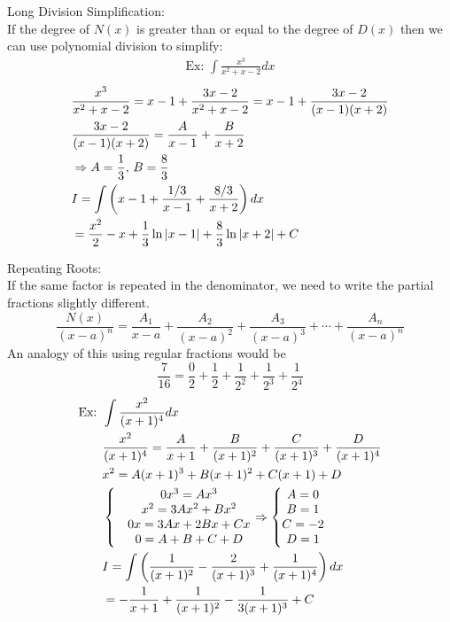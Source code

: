 \documentclass[11pt, fleqn]{article}
\begin{document}
Long Division Simplification:\\
If the degree of $N(x)$ is greater than or equal to the degree of $D(x)$ then we can use polynomial division to simplify:\\
\begin{align*}
    \text{Ex: }\int\frac{x^3}{x^2+x-2}dx
\end{align*}
\begin{align*}
    &\frac{x^3}{x^2+x-2}=x-1+\frac{3x-2}{x^2+x-2}=x-1+\frac{3x-2}{(x-1)(x+2)}\\
    &\frac{3x-2}{(x-1)(x+2)}=\frac{A}{x-1}+\frac{B}{x+2}\\
    &\Rightarrow A=\frac{1}{3},\,B=\frac{8}{3}\\
    &I=\int\left( x-1+\frac{1/3}{x-1}+\frac{8/3}{x+2} \right)dx\\
    &=\frac{x^2}{2}-x+\frac{1}{3}\ln|x-1|+\frac{8}{3}\ln|x+2|+C
\end{align*}

Repeating Roots:\\
If the same factor is repeated in the denominator, we need to write the partial fractions slightly different.
$$\frac{N(x)}{(x-a)^n}=\frac{A_1}{x-a}+\frac{A_2}{(x-a)^2}+\frac{A_3}{(x-a)^3}+\cdots+\frac{A_n}{(x-a)^n}$$
An analogy of this using regular fractions would be
$$\frac{7}{16}=\frac{0}{2}+\frac{1}{2}+\frac{1}{2^2}+\frac{1}{2^3}+\frac{1}{2^4}$$
\begin{align*}
    \text{Ex: }&\int\frac{x^2}{(x+1)^4}dx\\
    &\frac{x^2}{(x+1)^4}=\frac{A}{x+1}+\frac{B}{(x+1)^2}+\frac{C}{(x+1)^3}+\frac{D}{(x+1)^4}\\
    &x^2=A(x+1)^3+B(x+1)^2+C(x+1)+D\\
    &\left\{\begin{matrix} &0x^3=Ax^3\\&x^2=3Ax^2+Bx^2\\&0x=3Ax+2Bx+Cx\\&0=A+B+C+D \end{matrix}\right.\Rightarrow\left\{\begin{matrix} A=0\\B=1\\C=-2\\D=1 \end{matrix}\right.\\
    &I=\int\left( \frac{1}{(x+1)^2}-\frac{2}{(x+1)^3}+\frac{1}{(x+1)^4} \right)dx\\
    &=-\frac{1}{x+1}+\frac{1}{(x+1)^2}-\frac{1}{3(x+1)^3}+C
\end{align*}
\end{document}
